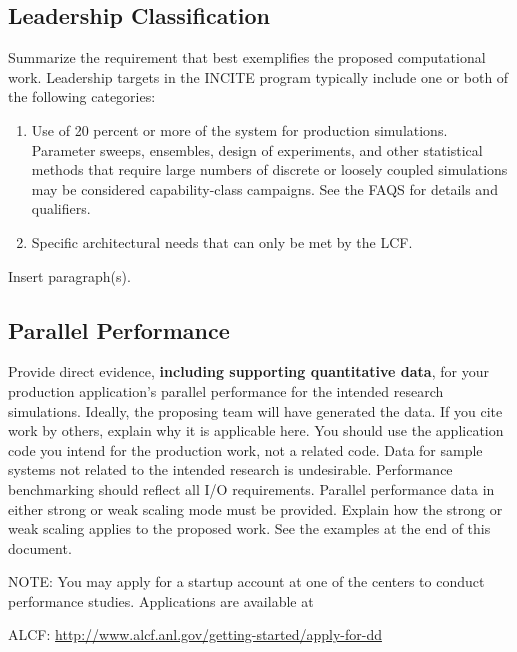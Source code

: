 \documentclass[11pt,letterpaper,english]{article}
\begin{document}
\vspace{-.25in}
\subsection{Leadership Classification}
\vspace{-.2in}

Summarize the requirement that best exemplifies the proposed computational work. Leadership targets in the INCITE program typically include one or both of the following categories: 

\vspace{-.25in}
\begin{enumerate}
\item Use of 20 percent or more of the system for production simulations. Parameter sweeps, ensembles, design of experiments, and other statistical methods that require large numbers of discrete or loosely coupled simulations may be considered capability-class campaigns. See the FAQS for details and qualifiers.
\item Specific architectural needs that can only be met by the LCF.
\end{enumerate}
\vspace{-.2in}
Insert paragraph(s).

\vspace{-.25in}
\subsection{Parallel Performance}
\vspace{-.2in}

Provide direct evidence, {\bf including supporting quantitative data}, for your production application's parallel performance for the intended research simulations. Ideally, the proposing team will have generated the data. If you cite work by others, explain why it is applicable here. You should use the application code you intend for the production work, not a related code. Data for sample systems not related to the intended research is undesirable. Performance benchmarking should reflect all I/O requirements. Parallel performance data in either strong or weak scaling mode must be provided. Explain how the strong or weak scaling applies to the proposed work. See the examples at the end of this document. 

NOTE: You may apply for a startup account at one of the centers to conduct performance studies. Applications are available at

ALCF: {\href{http://www.alcf.anl.gov/getting-started/apply-for-dd}{http://www.alcf.anl.gov/getting-started/apply-for-dd}}
\end{document}
